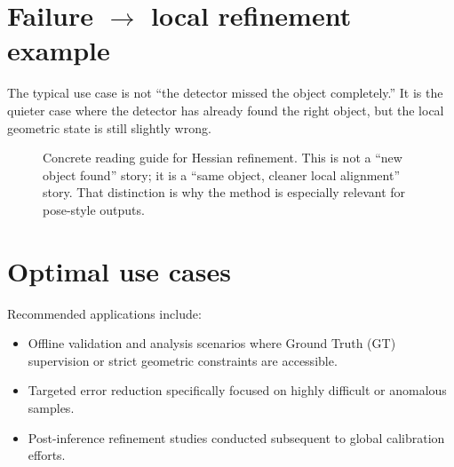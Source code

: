 \section{Failure \texorpdfstring{$\rightarrow$}{->} local refinement example}
The typical use case is not ``the detector missed the object completely.''
It is the quieter case where the detector has already found the right object, but the local geometric state is still slightly wrong.

\begin{figure}[h]
\centering
{}
\caption{Concrete reading guide for Hessian refinement. This is not a ``new object found'' story; it is a ``same object, cleaner local alignment'' story. That distinction is why the method is especially relevant for pose-style outputs.}
\end{figure}

\section{Optimal use cases}
Recommended applications include:
\begin{itemize}
  \item Offline validation and analysis scenarios where Ground Truth (GT) supervision or strict geometric constraints are accessible.
  \item Targeted error reduction specifically focused on highly difficult or anomalous samples.
  \item Post-inference refinement studies conducted subsequent to global calibration efforts.
\end{itemize}

